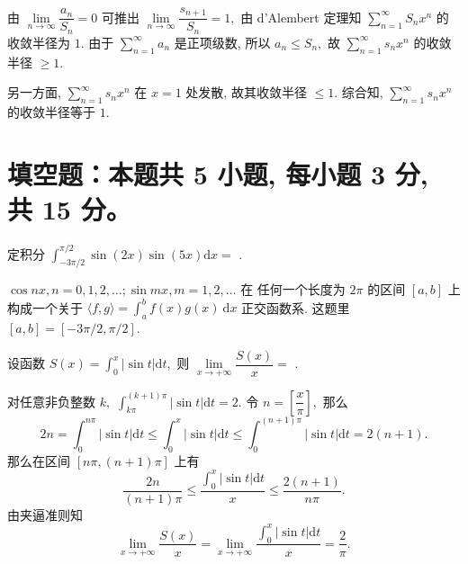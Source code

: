 \begin{solution}
  由 $\lim\limits_{n\to\infty} \dfrac{a_n}{S_n} = 0$ 可推出 $\lim\limits_{n\to\infty} \dfrac{s_{n+1}}{S_n} = 1,$ 由 d'Alembert 定理知 $\sum\limits_{n=1}^{\infty} S_n x^n$ 的收敛半径为 $1.$ 由于 $\sum\limits_{n=1}^{\infty} a_n$ 是正项级数, 所以 $a_n \leqslant S_n,$ 故 $\sum\limits_{n=1}^{\infty} s_n x^n$ 的收敛半径 $\geqslant 1.$

  另一方面, $\sum\limits_{n=1}^{\infty} s_n x^n$ 在 $x = 1$ 处发散, 故其收敛半径 $\leqslant 1.$ 综合知, $\sum\limits_{n=1}^{\infty} s_n x^n$ 的收敛半径等于 $1.$
\end{solution}


\section{填空题：本题共 5 小题, 每小题 3 分, 共 15 分。}



\begin{question}
  定积分 $\int_{-3\pi/2}^{\pi/2} \sin(2x) \sin(5x) \mathrm{d} x = $ \fillin[0].
\end{question}

\begin{solution}
  $\cos nx, n = 0, 1, 2, \dots; \sin m x, m = 1, 2, \dots$ 在 任何一个长度为 $2\pi$ 的区间 $[a,b]$ 上构成一个关于 $\langle f, g \rangle = \int_{a}^{b} f(x)g (x) ~ \mathrm{d} x$ 正交函数系. 这题里 $[a, b] = [-3\pi/2, \pi/2].$
\end{solution}

\begin{question}
  设函数 $S(x) = \int_0^x \lvert \sin t \rvert \mathrm{d} t,$ 则 $\lim\limits_{x\to+\infty} \dfrac{S(x)}{x} =$ \fillin[$\dfrac{2}{\pi}$].
\end{question}

\begin{solution}
  对任意非负整数 $k,$ $\int_{k\pi}^{(k+1)\pi} \lvert \sin t \rvert \mathrm{d} t = 2.$ 令 $n = \left[ \dfrac{x}{\pi} \right],$ 那么
  $$2n = \int_0^{n\pi} \lvert \sin t \rvert \mathrm{d} t \leqslant \int_0^x \lvert \sin t \rvert \mathrm{d} t \leqslant \int_0^{(n+1)\pi} \lvert \sin t \rvert \mathrm{d} t = 2(n+1).$$
  那么在区间 $[n\pi, (n+1)\pi]$ 上有
  $$\dfrac{2n}{(n+1)\pi} \leqslant \dfrac{\int_0^x \lvert \sin t \rvert \mathrm{d} t}{x} \leqslant \dfrac{2(n+1)}{n\pi}.$$
  由夹逼准则知
  $$\lim\limits_{x\to+\infty} \dfrac{S(x)}{x} = \lim\limits_{x\to+\infty} \dfrac{\int_0^x \lvert \sin t \rvert \mathrm{d} t}{x} = \dfrac{2}{\pi}.$$
\end{solution}

